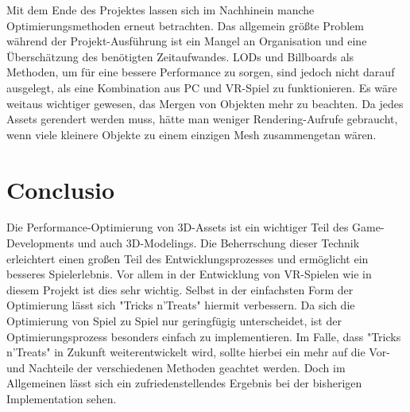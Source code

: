 Mit dem Ende des Projektes lassen sich im Nachhinein manche Optimierungsmethoden erneut betrachten. Das allgemein größte Problem während der Projekt-Ausführung ist ein Mangel an Organisation und eine Überschätzung des benötigten Zeitaufwandes. LODs und Billboards als Methoden, um für eine bessere Performance zu sorgen, sind jedoch nicht darauf ausgelegt, als eine Kombination aus PC und VR-Spiel zu funktionieren. Es wäre weitaus wichtiger gewesen, das Mergen von Objekten mehr zu beachten. Da jedes Assets gerendert werden muss, hätte man weniger Rendering-Aufrufe gebraucht, wenn viele kleinere Objekte zu einem einzigen Mesh zusammengetan wären.\cite[S.154]{_unity_game_optimization}

\chapter{Conclusio}

Die Performance-Optimierung von 3D-Assets ist ein wichtiger Teil des Game-Developments und auch 3D-Modelings. Die Beherrschung dieser Technik erleichtert einen großen Teil des Entwicklungsprozesses und ermöglicht ein besseres Spielerlebnis. Vor allem in der Entwicklung von VR-Spielen wie in diesem Projekt ist dies sehr wichtig. Selbst in der einfachsten Form der Optimierung lässt sich "Tricks n’Treats" hiermit verbessern. Da sich die Optimierung von Spiel zu Spiel nur geringfügig unterscheidet, ist der Optimierungsprozess besonders einfach zu implementieren. Im Falle, dass "Tricks n’Treats" in Zukunft weiterentwickelt wird, sollte hierbei ein mehr auf die Vor- und Nachteile der verschiedenen Methoden geachtet werden. Doch im Allgemeinen lässt sich ein zufriedenstellendes Ergebnis bei der bisherigen Implementation sehen.

